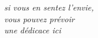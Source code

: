 \begin{vcenterpage}
\begin{flushright}
   \large\em\null\vskip1in 
   si vous en sentez l'envie, \\
  vous pouvez prévoir\\
  une dédicace ici \vfill
 \end{flushright}
\end{vcenterpage}
\thispagestyle{empty}
\vspace*{5cm}